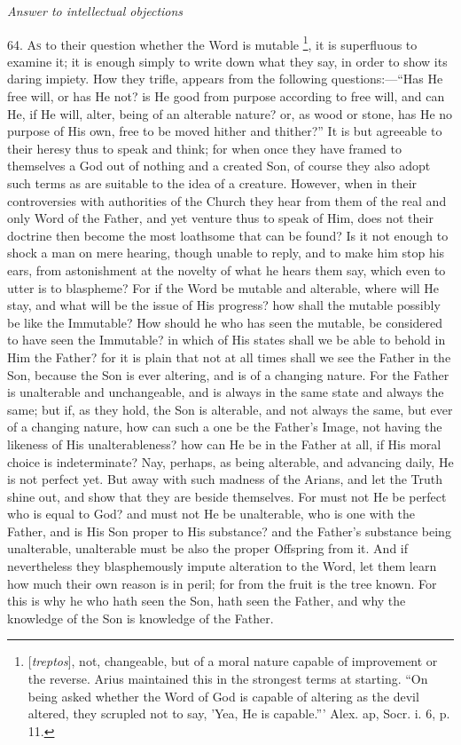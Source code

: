 
\emph{Answer
to intellectual objections}

64. A\textsc{s} to their question
whether the Word is mutable \footnote{[\emph{treptos}], not, changeable, but of a moral nature capable of
improvement or the reverse. Arius maintained this in the strongest
terms at starting. ``On being asked whether the Word of God is capable
of altering as the devil altered, they scrupled not to say, 'Yea, He
is capable.''' Alex. ap, Socr. i. 6, p. 11.},
it is superfluous to examine it; it is enough simply to write down
what they say, in order to show its daring impiety. How they trifle,
appears from the following questions:—``Has He free will, or has He
not? is He good from purpose according to free will, and can He, if He
will, alter, being of an alterable nature? or, as wood or stone, has
He no purpose of His own, free to be moved hither and thither?'' It is
but agreeable to their heresy thus to speak and think; for when once
they have framed to themselves a God out of nothing and a created Son,
of course they also adopt such terms as are suitable to the idea of a
creature. However, when in their controversies with authorities of the
Church they hear from them of the real and only Word of the Father,
and yet venture thus to speak of Him, does not their doctrine then
become the most loathsome that can be found? Is it not enough to shock
a man on mere hearing, though unable to reply, and to make him stop
his ears, from astonishment at the novelty of what he hears them say,
which even to utter is to blaspheme? For if the Word be mutable and
alterable, where will He stay, and what will be the issue of His
progress? how shall the mutable possibly be like the Immutable? How
should he who has seen the mutable, be considered to have seen the
Immutable? in which of His states shall we be able to behold in Him
the Father? for it is plain that not at all times shall we see
the Father in the Son, because the Son is ever altering, and is of a
changing nature. For the Father is unalterable and unchangeable, and
is always in the same state and always the same; but if, as they hold,
the Son is alterable, and not always the same, but ever of a changing
nature, how can such a one be the Father's Image, not having the
likeness of His unalterableness? how can He be in the Father at all,
if His moral choice is indeterminate? Nay, perhaps, as being
alterable, and advancing daily, He is not perfect yet. But away with
such madness of the Arians, and let the Truth shine out, and show that
they are beside themselves. For must not He be perfect who is equal to
God? and must not He be unalterable, who is one with the Father, and
is His Son proper to His substance? and the Father's substance being
unalterable, unalterable must be also the proper Offspring from it.
And if nevertheless they blasphemously impute alteration to the Word,
let them learn how much their own reason is in peril; for from the
fruit is the tree known. For this is why he who hath seen the Son,
hath seen the Father, and why the knowledge of the Son is knowledge of
the Father.

